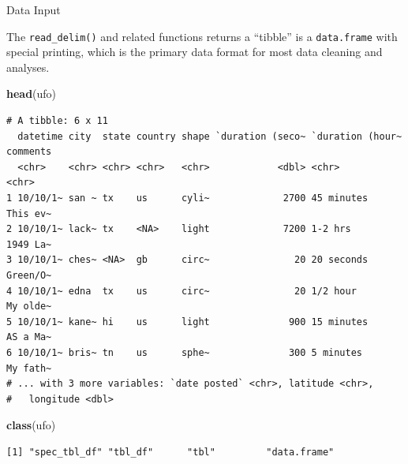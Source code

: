 \documentclass[
  ignorenonframetext,
]{beamer}
\newenvironment{Shaded}{\begin{snugshade}}{\end{snugshade}}
\newcommand{\KeywordTok}[1]{\textcolor[rgb]{0.13,0.29,0.53}{\textbf{#1}}}
\newcommand{\NormalTok}[1]{#1}
\begin{document}
\begin{frame}[fragile]{Data Input}
\protect\hypertarget{data-input-9}{}

The \texttt{read\_delim()} and related functions returns a ``tibble'' is
a \texttt{data.frame} with special printing, which is the primary data
format for most data cleaning and analyses.

\begin{Shaded}
\begin{Highlighting}[]
\KeywordTok{head}\NormalTok{(ufo)}
\end{Highlighting}
\end{Shaded}

\begin{verbatim}
# A tibble: 6 x 11
  datetime city  state country shape `duration (seco~ `duration (hour~ comments
  <chr>    <chr> <chr> <chr>   <chr>            <dbl> <chr>            <chr>   
1 10/10/1~ san ~ tx    us      cyli~             2700 45 minutes       This ev~
2 10/10/1~ lack~ tx    <NA>    light             7200 1-2 hrs          1949 La~
3 10/10/1~ ches~ <NA>  gb      circ~               20 20 seconds       Green/O~
4 10/10/1~ edna  tx    us      circ~               20 1/2 hour         My olde~
5 10/10/1~ kane~ hi    us      light              900 15 minutes       AS a Ma~
6 10/10/1~ bris~ tn    us      sphe~              300 5 minutes        My fath~
# ... with 3 more variables: `date posted` <chr>, latitude <chr>,
#   longitude <dbl>
\end{verbatim}

\begin{Shaded}
\begin{Highlighting}[]
\KeywordTok{class}\NormalTok{(ufo)}
\end{Highlighting}
\end{Shaded}

\begin{verbatim}
[1] "spec_tbl_df" "tbl_df"      "tbl"         "data.frame" 
\end{verbatim}

\end{frame}
\end{document}
